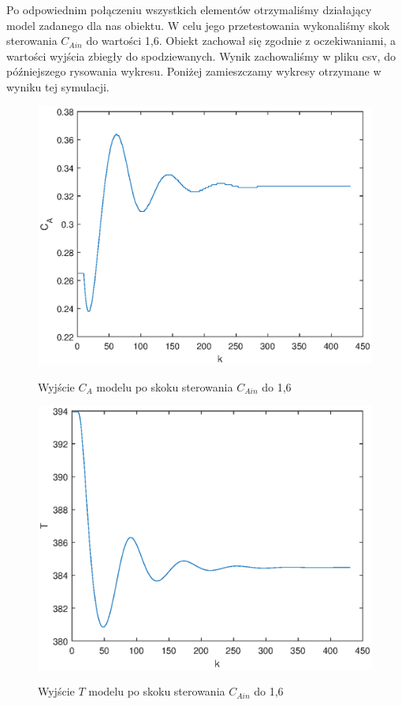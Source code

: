Po odpowiednim połączeniu wszystkich elementów otrzymaliśmy działający model zadanego dla nas obiektu. W celu jego przetestowania wykonaliśmy skok sterowania $C_{Ain}$ do wartości 1,6. Obiekt zachował się zgodnie z oczekiwaniami, a wartości wyjścia zbiegły do spodziewanych. Wynik zachowaliśmy w pliku csv, do późniejszego rysowania wykresu. Poniżej zamieszczamy wykresy otrzymane w wyniku tej symulacji.

\begin{figure}[h!]
	\centering
	\includegraphics[width=.8\linewidth]{img/model1.eps}
	\label{ch1:model1}
	\caption{Wyjście $C_A$ modelu po skoku sterowania $C_{Ain}$ do 1,6}
\end{figure}

\begin{figure}[h!]
\centering
\includegraphics[width=.8\linewidth]{img/model2.eps}
\label{ch1:model2}
\caption{Wyjście $T$ modelu po skoku sterowania $C_{Ain}$ do 1,6}
\end{figure}

